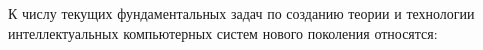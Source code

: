 
К числу текущих фундаментальных задач по созданию теории и технологии интеллектуальных компьютерных систем нового поколения относятся:
